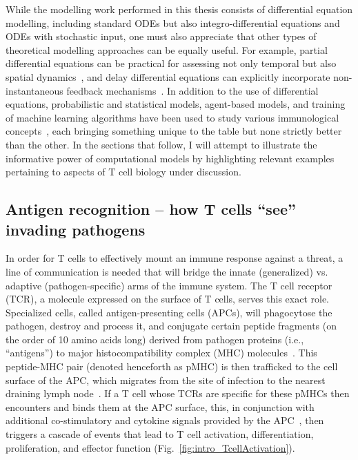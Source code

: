 While the modelling work performed in this thesis consists of differential equation modelling, including standard ODEs but also integro-differential equations and ODEs with stochastic input, one must also appreciate that other types of theoretical modelling approaches can be equally useful. For example, partial differential equations can be practical for assessing not only temporal but also spatial dynamics~\cite{su2009mathematical,moise2019rheumatoid}, and delay differential equations can explicitly incorporate non-instantaneous feedback mechanisms~\cite{bocharov1998modelling,gourley2008dynamics,fatehi2019time}. In addition to the use of differential equations, probabilistic and statistical models, agent-based models, and training of machine learning algorithms have been used to study various immunological concepts~\cite{germain2011systems,yates2014theories,eftimie2016mathematical,smith2018validated, chakraborty2017perspective}, each bringing something unique to the table but none strictly better than the other. In the sections that follow, I will attempt to illustrate the informative power of computational models by highlighting relevant examples pertaining to aspects of T cell biology under discussion. 

\subsection{Antigen recognition -- how T cells ``see'' invading pathogens}
\label{sec:intro_overview_antigenRecognition}

In order for T cells to effectively mount an immune response against a threat, a line of communication is needed that will bridge the innate (generalized) vs. adaptive (pathogen-specific) arms of the immune system. The T cell receptor (TCR), a molecule expressed on the surface of T cells, serves this exact role. Specialized cells, called antigen-presenting cells (APCs), will phagocytose the pathogen, destroy and process it, and conjugate certain peptide fragments (on the order of 10 amino acids long) derived from pathogen proteins (i.e., ``antigens'') to major histocompatibility complex (MHC) molecules~\cite{blum2013pathways,trolle2016length,meydan2013prediction,jamaleddine2020immune}. This peptide-MHC pair (denoted henceforth as pMHC) is then trafficked to the cell surface of the APC, which migrates from the site of infection to the nearest draining lymph node~\cite{martin2009dendritic}. If a T cell whose TCRs are specific for these pMHCs then encounters and binds them at the APC surface, this, in conjunction with additional co-stimulatory and cytokine signals provided by the APC~\cite{frauwirth2002activation,curtsinger1999inflammatory,curtsinger2010inflammatory}, then triggers a cascade of events that lead to T cell activation, differentiation, proliferation, and effector function (Fig.~\ref{fig:intro_TcellActivation}).

